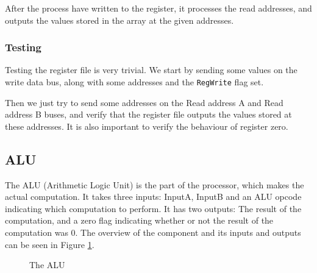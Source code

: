 After the process have written to the register, it processes the read
addresses, and outputs the values stored in the array at the given addresses.

\subsubsection*{Testing}
Testing the register file is very trivial. We start by sending some values
on the write data bus, along with some addresses and the \texttt{RegWrite}
flag set.

Then we just try to send some addresses on the Read address A and Read
address B buses, and verify that the register file outputs the values
stored at these addresses. It is also important to verify the behaviour of
register zero.

\subsection{ALU}
The ALU (Arithmetic Logic Unit) is the part of the processor, which makes the
actual computation. It takes three inputs: InputA, InputB and an ALU opcode
indicating which computation to perform. It has two outputs: The result of the
computation, and a zero flag indicating whether or not the result of the
computation was 0. The overview of the component and its inputs and outputs can
be seen in Figure \ref{fig:alu}.

\begin{figure}
    \centering
    \caption{The ALU}
    \label{fig:alu}
\end{figure}

